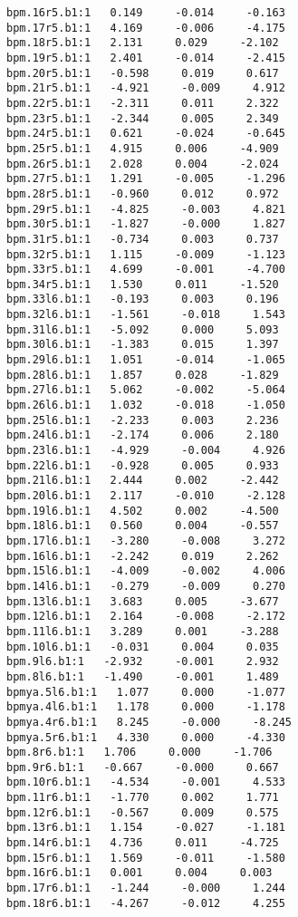 \begin{verbatim}
bpm.16r5.b1:1   0.149     -0.014     -0.163
bpm.17r5.b1:1   4.169     -0.006     -4.175
bpm.18r5.b1:1   2.131     0.029     -2.102
bpm.19r5.b1:1   2.401     -0.014     -2.415
bpm.20r5.b1:1   -0.598     0.019     0.617
bpm.21r5.b1:1   -4.921     -0.009     4.912
bpm.22r5.b1:1   -2.311     0.011     2.322
bpm.23r5.b1:1   -2.344     0.005     2.349
bpm.24r5.b1:1   0.621     -0.024     -0.645
bpm.25r5.b1:1   4.915     0.006     -4.909
bpm.26r5.b1:1   2.028     0.004     -2.024
bpm.27r5.b1:1   1.291     -0.005     -1.296
bpm.28r5.b1:1   -0.960     0.012     0.972
bpm.29r5.b1:1   -4.825     -0.003     4.821
bpm.30r5.b1:1   -1.827     -0.000     1.827
bpm.31r5.b1:1   -0.734     0.003     0.737
bpm.32r5.b1:1   1.115     -0.009     -1.123
bpm.33r5.b1:1   4.699     -0.001     -4.700
bpm.34r5.b1:1   1.530     0.011     -1.520
bpm.33l6.b1:1   -0.193     0.003     0.196
bpm.32l6.b1:1   -1.561     -0.018     1.543
bpm.31l6.b1:1   -5.092     0.000     5.093
bpm.30l6.b1:1   -1.383     0.015     1.397
bpm.29l6.b1:1   1.051     -0.014     -1.065
bpm.28l6.b1:1   1.857     0.028     -1.829
bpm.27l6.b1:1   5.062     -0.002     -5.064
bpm.26l6.b1:1   1.032     -0.018     -1.050
bpm.25l6.b1:1   -2.233     0.003     2.236
bpm.24l6.b1:1   -2.174     0.006     2.180
bpm.23l6.b1:1   -4.929     -0.004     4.926
bpm.22l6.b1:1   -0.928     0.005     0.933
bpm.21l6.b1:1   2.444     0.002     -2.442
bpm.20l6.b1:1   2.117     -0.010     -2.128
bpm.19l6.b1:1   4.502     0.002     -4.500
bpm.18l6.b1:1   0.560     0.004     -0.557
bpm.17l6.b1:1   -3.280     -0.008     3.272
bpm.16l6.b1:1   -2.242     0.019     2.262
bpm.15l6.b1:1   -4.009     -0.002     4.006
bpm.14l6.b1:1   -0.279     -0.009     0.270
bpm.13l6.b1:1   3.683     0.005     -3.677
bpm.12l6.b1:1   2.164     -0.008     -2.172
bpm.11l6.b1:1   3.289     0.001     -3.288
bpm.10l6.b1:1   -0.031     0.004     0.035
bpm.9l6.b1:1   -2.932     -0.001     2.932
bpm.8l6.b1:1   -1.490     -0.001     1.489
bpmya.5l6.b1:1   1.077     0.000     -1.077
bpmya.4l6.b1:1   1.178     0.000     -1.178
bpmya.4r6.b1:1   8.245     -0.000     -8.245
bpmya.5r6.b1:1   4.330     0.000     -4.330
bpm.8r6.b1:1   1.706     0.000     -1.706
bpm.9r6.b1:1   -0.667     -0.000     0.667
bpm.10r6.b1:1   -4.534     -0.001     4.533
bpm.11r6.b1:1   -1.770     0.002     1.771
bpm.12r6.b1:1   -0.567     0.009     0.575
bpm.13r6.b1:1   1.154     -0.027     -1.181
bpm.14r6.b1:1   4.736     0.011     -4.725
bpm.15r6.b1:1   1.569     -0.011     -1.580
bpm.16r6.b1:1   0.001     0.004     0.003
bpm.17r6.b1:1   -1.244     -0.000     1.244
bpm.18r6.b1:1   -4.267     -0.012     4.255

\end{verbatim}
